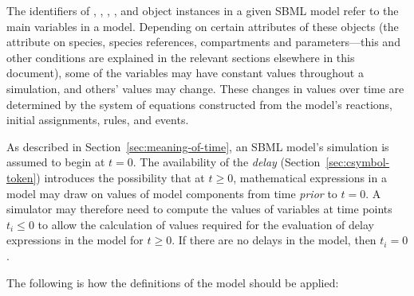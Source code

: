 The identifiers of \Species, \SpeciesReference, \Compartment, \Parameter, and
\Reaction object instances in a given SBML model refer to the main
variables in a model.  Depending on certain attributes of these
objects (\eg the attribute  on species, species references, compartments
and parameters---this and other conditions are explained in the
relevant sections elsewhere in this document), some of the
variables may have constant values throughout a simulation, and
others' values may change.  These changes in values over time are
determined by the system of equations constructed from the model's
reactions, initial assignments, rules, and events.

As described in Section~\ref{sec:meaning-of-time}, an SBML model's
simulation is assumed to begin at $t = 0$.  The availability of
the \emph{delay}  (Section~\ref{sec:csymbol-token})
introduces the possibility that at $t \geq 0$, mathematical
expressions in a model may draw on values of model components from
time \emph{prior} to $t = 0$.  A simulator may therefore need to
compute the values of variables at time points $t_i \leq 0$ to
allow the calculation of values required for the evaluation of
delay expressions in the model for $t \geq 0$.  If there are no
delays in the model, then $t_i = 0$.

The following is how the definitions of the model should be
applied:


